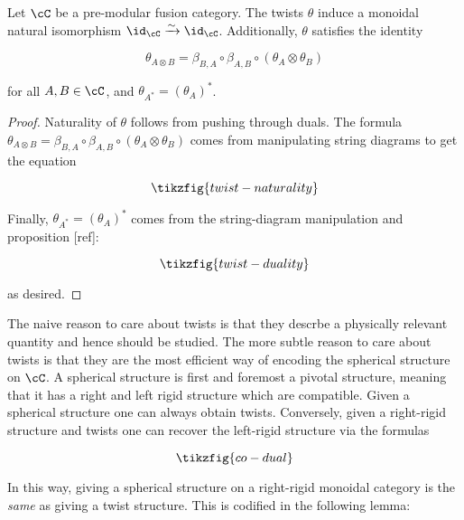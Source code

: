 \begin{prop} Let $\cC$ be a pre-modular fusion category. The twists $\theta$ induce a monoidal natural isomorphism $\id_{\cC}\xrightarrow{\sim}\id_{\cC}$. Additionally, $\theta$ satisfies the identity

$$\theta_{A\otimes B}=\beta_{B,A}\circ \beta_{A,B}\circ (\theta_{A}\otimes \theta_{B})$$

for all $A,B\in \cC$, and $\theta_{A^*}=(\theta_A)^*$.
\end{prop}
\begin{proof} Naturality of $\theta$ follows from pushing through duals. The formula $\theta_{A\otimes B}=\beta_{B,A}\circ \beta_{A,B}\circ (\theta_{A}\otimes \theta_{B})$ comes from manipulating string diagrams to get the equation

\begin{equation*}
\tikzfig{twist-naturality}
\end{equation*}


Finally, $\theta_{A^*}=(\theta_A)^*$ comes from the string-diagram manipulation and proposition [ref]:

\begin{equation*}
\tikzfig{twist-duality}
\end{equation*}

as desired.
\end{proof}

The naive reason to care about twists is that they descrbe a physically relevant quantity and hence should be studied. The more subtle reason to care about twists is that they are the most efficient way of encoding the spherical structure on $\cC$. A spherical structure is first and foremost a pivotal structure, meaning that it has a right and left rigid structure which are compatible. Given a spherical structure one can always obtain twists. Conversely, given a right-rigid structure and twists one can recover the left-rigid structure via the formulas

\begin{equation*}
\tikzfig{co-dual}
\end{equation*}

In this way, giving a spherical structure on a right-rigid monoidal category is the \textit{same} as giving a twist structure. This is codified in the following lemma:

